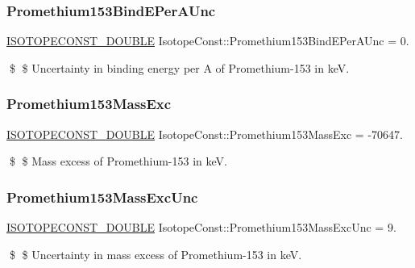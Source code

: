 \subsubsection{\texorpdfstring{Promethium153\+Bind\+E\+Per\+A\+Unc}{Promethium153BindEPerAUnc}}
{\footnotesize\ttfamily \mbox{\hyperlink{group___isotope_const-_macros_ga8f45a7272ce02c0b4c65c44636ed719a}{I\+S\+O\+T\+O\+P\+E\+C\+O\+N\+S\+T\+\_\+\+D\+O\+U\+B\+LE}} Isotope\+Const\+::\+Promethium153\+Bind\+E\+Per\+A\+Unc = 0.}

\$ \$ Uncertainty in binding energy per A of Promethium-\/153 in keV. \mbox{\label{group___isotope_const-_promethium-_pm153_ga1359965077637bb5e9030277c78695f1}} 
\subsubsection{\texorpdfstring{Promethium153\+Mass\+Exc}{Promethium153MassExc}}
{\footnotesize\ttfamily \mbox{\hyperlink{group___isotope_const-_macros_ga8f45a7272ce02c0b4c65c44636ed719a}{I\+S\+O\+T\+O\+P\+E\+C\+O\+N\+S\+T\+\_\+\+D\+O\+U\+B\+LE}} Isotope\+Const\+::\+Promethium153\+Mass\+Exc = -\/70647.}

\$ \$ Mass excess of Promethium-\/153 in keV. \mbox{\label{group___isotope_const-_promethium-_pm153_ga5430dfda308d5706c37c13d2df875a67}} 
\subsubsection{\texorpdfstring{Promethium153\+Mass\+Exc\+Unc}{Promethium153MassExcUnc}}
{\footnotesize\ttfamily \mbox{\hyperlink{group___isotope_const-_macros_ga8f45a7272ce02c0b4c65c44636ed719a}{I\+S\+O\+T\+O\+P\+E\+C\+O\+N\+S\+T\+\_\+\+D\+O\+U\+B\+LE}} Isotope\+Const\+::\+Promethium153\+Mass\+Exc\+Unc = 9.}

\$ \$ Uncertainty in mass excess of Promethium-\/153 in keV. \mbox{\label{group___isotope_const-_promethium-_pm153_ga2d744fd2df1bf849942c740fd5ccceee}} 
